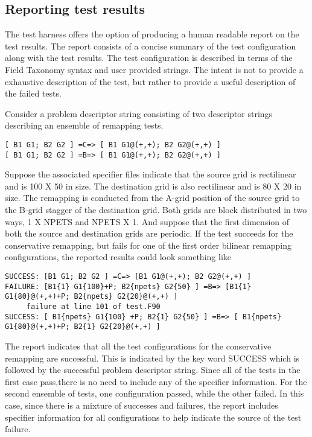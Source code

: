 \subsection{Reporting test results}
The test harness offers the option of producing a human readable report on the test results. The report consists of a concise summary of the test configuration along with the test results. The test configuration is described in terms of the Field Taxonomy syntax and user provided 
strings. The intent is not to provide a exhaustive description of the test, but rather to provide a useful description of the failed tests.

Consider a problem descriptor string consisting of two descriptor strings describing an ensemble of remapping tests. 

\begin{verbatim}
[ B1 G1; B2 G2 ] =C=> [ B1 G1@(+,+); B2 G2@(+,+) ] 
[ B1 G1; B2 G2 ] =B=> [ B1 G1@(+,+); B2 G2@(+,+) ]
\end{verbatim}

Suppose the associated specifier files indicate that the source  grid is rectilinear and is 100 X 50 in size. The destination grid is also rectilinear and is 80 X 20 in size. The remapping is conducted from the A-grid position of the source grid to the B-grid stagger of the destination grid. Both grids are block distributed in two 
ways, 1 X NPETS and NPETS X 1. And suppose that the first dimension of both the source and destination grids are periodic. If the test succeeds for the conservative remapping, but fails for one of the first order bilinear remapping configurations, the reported results
could look something like

\begin{verbatim}
SUCCESS: [B1 G1; B2 G2 ] =C=> [B1 G1@(+,+); B2 G2@(+,+) ] 
FAILURE: [B1{1} G1{100}+P; B2{npets} G2{50} ] =B=> [B1{1} G1{80}@(+,+)+P; B2{npets} G2{20}@(+,+) ] 
     failure at line 101 of test.F90
SUCCESS: [ B1{npets} G1{100} +P; B2{1} G2{50} ] =B=> [ B1{npets} G1{80}@(+,+)+P; B2{1} G2{20}@(+,+) ] 
\end{verbatim}

The report indicates that all the test configurations for the conservative remapping are successful. This is indicated by the key word SUCCESS which is followed by the successful problem descriptor string. Since all of the tests in the first case pass,there is no need to include any of the specifier information. For the second ensemble of tests, one configuration passed, while the other failed. In this case,
since there is a mixture of successes and failures, the report includes 
specifier information for all configurations to help indicate the source of the test failure. 

